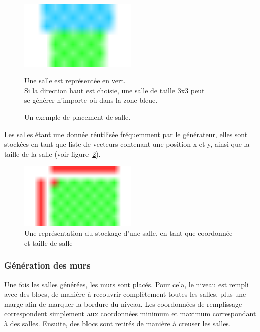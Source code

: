 \documentclass[10pt]{report}
\begin{document}
\begin{figure}[H]
  \centering
  \includegraphics[width=0.5\textwidth]{images/room_placement}
  \caption{Un exemple de placement de salle.}
  Une salle est représentée en vert.\\ 
  Si la direction haut est choisie, une salle de taille 3x3 peut\\
  se générer n'importe où dans la zone bleue.
  \label{fig:room_placement}
\end{figure}

Les salles étant une donnée réutilisée fréquemment par le générateur,
elles sont stockées en tant que liste de vecteurs contenant une position
x et y, ainsi que la taille de la salle (voir figure~\ref{fig:room_data}).

\begin{figure}[H]
  \centering
  \includegraphics[width=0.5\textwidth]{images/room_storage}
  \caption{Une représentation du stockage d'une salle, 
  en tant que coordonnée et taille de salle}
  \label{fig:room_data}
\end{figure}

\subsubsection{Génération des murs}

Une fois les salles générées, les murs sont placés.
Pour cela, le niveau est rempli avec des blocs, de manière à recouvrir complètement toutes
les salles, plus une marge afin de marquer la bordure du niveau. 
Les coordonnées de remplissage correspondent simplement aux coordonnées
minimum et maximum correspondant à des salles.
Ensuite, des blocs sont retirés de manière à creuser les salles.
\end{document}
